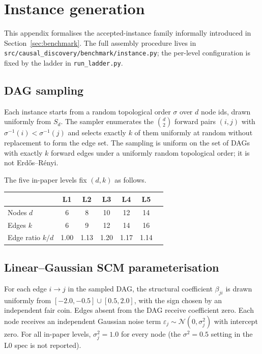 \section{Instance generation}
\label{app:instance}

This appendix formalises the accepted-instance family informally introduced in Section~\ref{sec:benchmark}. The full assembly procedure lives in \texttt{src/causal\_discovery/benchmark/instance.py}; the per-level configuration is fixed by the ladder in \texttt{run\_ladder.py}.

\subsection{DAG sampling}
\label{app:instance:dag}

Each instance starts from a random topological order $\sigma$ over $d$ node ids, drawn uniformly from $S_d$. The sampler enumerates the $\binom{d}{2}$ forward pairs $(i, j)$ with $\sigma^{-1}(i) < \sigma^{-1}(j)$ and selects exactly $k$ of them uniformly at random without replacement to form the edge set. The sampling is uniform on the set of DAGs with exactly $k$ forward edges under a uniformly random topological order; it is not Erd\H{o}s--R\'enyi.

The five in-paper levels fix $(d, k)$ as follows.

\begin{center}
\begin{tabular}{lcccccc}
\toprule
                        & L1 & L2 & L3 & L4  & L5  \\
\midrule
Nodes $d$              & 6  & 8  & 10 & 12  & 14  \\
Edges $k$              & 6  & 9  & 12 & 14  & 16  \\
Edge ratio $k/d$       & 1.00 & 1.13 & 1.20 & 1.17 & 1.14 \\
\bottomrule
\end{tabular}
\end{center}

\subsection{Linear--Gaussian SCM parameterisation}
\label{app:instance:scm}

For each edge $i \to j$ in the sampled DAG, the structural coefficient $\beta_{ji}$ is drawn uniformly from $[-2.0, -0.5] \cup [0.5, 2.0]$, with the sign chosen by an independent fair coin. Edges absent from the DAG receive coefficient zero. Each node receives an independent Gaussian noise term $\varepsilon_j \sim \mathcal{N}(0, \sigma^2_j)$ with intercept zero. For all in-paper levels, $\sigma^2_j = 1.0$ for every node (the $\sigma^2 = 0.5$ setting in the L0 spec is not reported).

